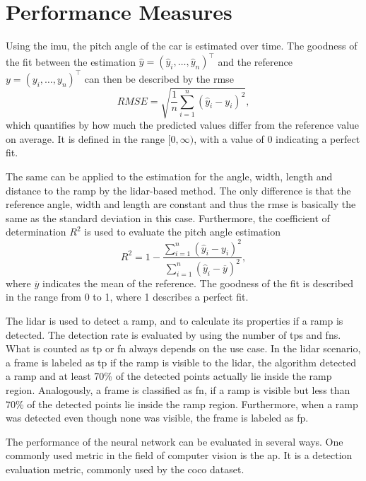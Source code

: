 \section{Performance Measures}
\label{sec:performance_measures}
Using the \gls{imu}, the pitch angle of the car is estimated over time.
The goodness of the fit between the estimation $\hat{y} = (\hat{y}_i, \dots, \hat{y}_n)^\intercal$ and the reference $y = (y_i, \dots, y_n)^\intercal$ can then be described by the \gls{rmse}
\begin{equation}
    RMSE = \sqrt{\frac{1}{n}\sum_{i = 1}^n(\hat{y}_i - y_i)^2},
\end{equation}
which quantifies by how much the predicted values differ from the reference value on average.
It is defined in the range $[0, \infty)$, with a value of 0 indicating a perfect fit.\par
The same can be applied to the estimation for the angle, width, length and distance to the ramp by the \gls{lidar}-based method.
The only difference is that the reference angle, width and length are constant and thus the \gls{rmse} is basically the same as the standard deviation in this case.
Furthermore, the coefficient of determination $R^2$ is used to evaluate the pitch angle estimation
\begin{equation}
    R^2 = 1 - \frac{\sum\limits_{i = 1}^n(\hat{y}_i - y_i)^2}{\sum\limits_{i = 1}^n(\hat{y}_i - \overline{y})^2},
\end{equation}
where $\overline{y}$ indicates the mean of the reference.
The goodness of the fit is described in the range from 0 to 1, where 1 describes a perfect fit.\par
The \gls{lidar} is used to detect a ramp, and to calculate its properties if a ramp is detected.
The detection rate is evaluated by using the number of \glspl{tp} and \glspl{fn}.
What is counted as \gls{tp} or \gls{fn} always depends on the use case.
In the \gls{lidar} scenario, a frame is labeled as \gls{tp} if the ramp is visible to the \gls{lidar}, the algorithm detected a ramp and at least 70\% of the detected points actually lie inside the ramp region.
Analogously, a frame is classified as \gls{fn}, if a ramp is visible but less than 70\% of the detected points lie inside the ramp region.
Furthermore, when a ramp was detected even though none was visible, the frame is labeled as \gls{fp}.\par
The performance of the neural network can be evaluated in several ways.
One commonly used metric in the field of computer vision is the \gls{ap}.
It is a detection evaluation metric, commonly used by the \gls{coco} dataset.
